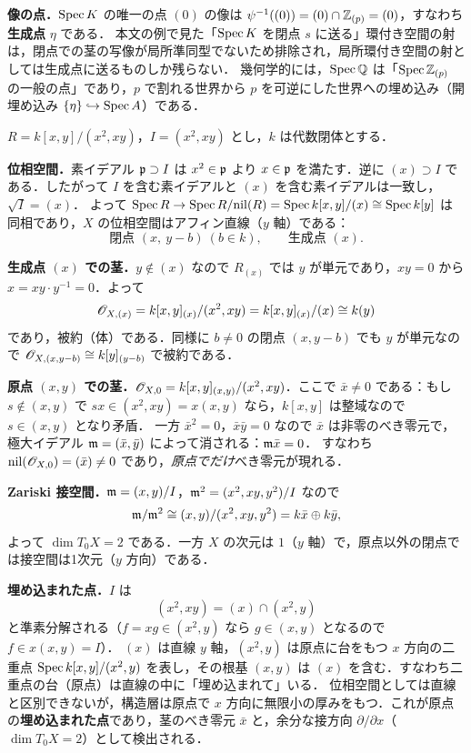 \textbf{像の点．}$\operatorname{Spec} K$ の唯一の点 $(0)$ の像は $\psi^{-1}((0))=(0)\cap\mathbb{Z}_{(p)}=(0)$，すなわち\textbf{生成点} $\eta$ である．
本文の例で見た「$\operatorname{Spec} K$ を閉点 $s$ に送る」環付き空間の射は，閉点での茎の写像が局所準同型でないため排除され，局所環付き空間の射としては生成点に送るものしか残らない．
幾何学的には，$\operatorname{Spec}\mathbb{Q}$ は「$\operatorname{Spec}\mathbb{Z}_{(p)}$ の一般の点」であり，$p$ で割れる世界から $p$ を可逆にした世界への埋め込み（開埋め込み $\{\eta\}\hookrightarrow\operatorname{Spec} A$）である．

$R=k[x,y]/(x^2,xy)$，$I=(x^2,xy)$ とし，$k$ は代数閉体とする．

\textbf{位相空間．}素イデアル $\mathfrak{p}\supset I$ は $x^2\in\mathfrak{p}$ より $x\in\mathfrak{p}$ を満たす．逆に $(x)\supset I$ である．したがって $I$ を含む素イデアルと $(x)$ を含む素イデアルは一致し，$\sqrt I=(x)$．
よって $\operatorname{Spec} R\to\operatorname{Spec} R/\mathrm{nil}(R)=\operatorname{Spec} k[x,y]/(x)\cong\operatorname{Spec} k[y]$ は同相であり，$X$ の位相空間はアフィン直線（$y$ 軸）である：
\[
  \text{閉点 }(x,\ y-b)\ (b\in k),\qquad \text{生成点 }(x).
\]

\textbf{生成点 $(x)$ での茎．}$y\notin(x)$ なので $R_{(x)}$ では $y$ が単元であり，$xy=0$ から $x=xy\cdot y^{-1}=0$．よって
\[
  \mathscr{O}_{X,(x)}=k[x,y]_{(x)}/(x^2,xy)=k[x,y]_{(x)}/(x)\cong k(y)
\]
であり，被約（体）である．同様に $b\neq0$ の閉点 $(x,y-b)$ でも $y$ が単元なので $\mathscr{O}_{X,(x,y-b)}\cong k[y]_{(y-b)}$ で被約である．

\textbf{原点 $(x,y)$ での茎．}$\mathscr{O}_{X,0}=k[x,y]_{(x,y)}/(x^2,xy)$．ここで $\bar x\neq0$ である：もし $s\notin(x,y)$ で $sx\in(x^2,xy)=x(x,y)$ なら，$k[x,y]$ は整域なので $s\in(x,y)$ となり矛盾．
一方 $\bar x^2=0$，$\bar x\bar y=0$ なので $\bar x$ は非零のべき零元で，極大イデアル $\mathfrak{m}=(\bar x,\bar y)$ によって消される：$\mathfrak{m}\bar x=0$．
すなわち $\mathrm{nil}(\mathscr{O}_{X,0})=(\bar x)\neq0$ であり，\emph{原点でだけ}べき零元が現れる．

\textbf{Zariski 接空間．}$\mathfrak{m}=(x,y)/I$，$\mathfrak{m}^2=(x^2,xy,y^2)/I$ なので
\[
  \mathfrak{m}/\mathfrak{m}^2\cong(x,y)/(x^2,xy,y^2)=k\bar x\oplus k\bar y,
\]
よって $\dim T_0X=2$ である．一方 $X$ の次元は $1$（$y$ 軸）で，原点以外の閉点では接空間は1次元（$y$ 方向）である．

\textbf{埋め込まれた点．}$I$ は
\[
  (x^2,xy)=(x)\cap(x^2,y)
\]
と準素分解される（$f=xg\in(x^2,y)$ なら $g\in(x,y)$ となるので $f\in x(x,y)=I$）．
$(x)$ は直線 $y$ 軸，$(x^2,y)$ は原点に台をもつ $x$ 方向の二重点 $\operatorname{Spec} k[x,y]/(x^2,y)$ を表し，その根基 $(x,y)$ は $(x)$ を含む．すなわち二重点の台（原点）は直線の中に「埋め込まれて」いる．
位相空間としては直線と区別できないが，構造層は原点で $x$ 方向に無限小の厚みをもつ．これが原点の\textbf{埋め込まれた点}であり，茎のべき零元 $\bar x$ と，余分な接方向 $\partial/\partial x$（$\dim T_0X=2$）として検出される．

